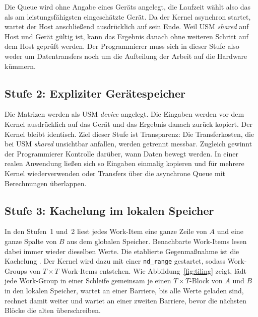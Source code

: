 \documentclass[12pt,a4paper]{article}
\begin{document}
Die Queue wird ohne Angabe eines Geräts angelegt, die Laufzeit wählt also das
als am leistungsfähigsten eingeschätzte Gerät. Da der Kernel asynchron
startet, wartet der Host anschließend ausdrücklich auf sein Ende. Weil USM
\emph{shared} auf Host und Gerät gültig ist, kann das Ergebnis danach ohne
weiteren Schritt auf dem Host geprüft werden. Der Programmierer muss sich in
dieser Stufe also weder um Datentransfers noch um die Aufteilung der Arbeit
auf die Hardware kümmern.

\subsection{Stufe 2: Expliziter Gerätespeicher}

Die Matrizen werden als USM \emph{device} angelegt. Die Eingaben werden vor
dem Kernel ausdrücklich auf das Gerät und das Ergebnis danach zurück kopiert.
Der Kernel bleibt identisch. Ziel dieser Stufe ist Transparenz: Die
Transferkosten, die bei USM \emph{shared} unsichtbar anfallen, werden
getrennt messbar. Zugleich gewinnt der Programmierer Kontrolle darüber, wann
Daten bewegt werden. In einer realen Anwendung ließen sich so Eingaben
einmalig kopieren und für mehrere Kernel wiederverwenden oder Transfers über
die asynchrone Queue mit Berechnungen überlappen.

\subsection{Stufe 3: Kachelung im lokalen Speicher}

In den Stufen~1 und~2 liest jedes Work-Item eine ganze Zeile von $A$ und eine
ganze Spalte von $B$ aus dem globalen Speicher. Benachbarte Work-Items lesen
dabei immer wieder dieselben Werte. Die etablierte Gegenmaßnahme ist die
Kachelung \cite{hwu2022pmpp, volkov2008gemm}. Der Kernel wird dazu mit einer
\texttt{nd\_range} gestartet, sodass Work-Groups von $T \times T$ Work-Items
entstehen. Wie Abbildung~\ref{fig:tiling} zeigt, lädt jede Work-Group in einer
Schleife gemeinsam je einen $T \times T$-Block von $A$ und $B$ in den lokalen
Speicher, wartet an einer Barriere, bis alle Werte geladen sind, rechnet damit
weiter und wartet an einer zweiten Barriere, bevor die nächsten Blöcke die
alten überschreiben.
\end{document}
